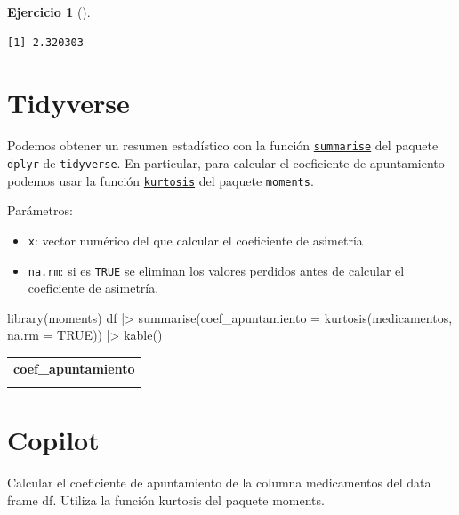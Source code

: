 \documentclass[
  a4paper,
]{scrreport}
\newenvironment{Shaded}{\begin{snugshade}}{\end{snugshade}}
\newcommand{\AttributeTok}[1]{\textcolor[rgb]{0.40,0.45,0.13}{#1}}
\newcommand{\ConstantTok}[1]{\textcolor[rgb]{0.56,0.35,0.01}{#1}}
\newcommand{\ExtensionTok}[1]{\textcolor[rgb]{0.00,0.23,0.31}{#1}}
\newcommand{\FunctionTok}[1]{\textcolor[rgb]{0.28,0.35,0.67}{#1}}
\newcommand{\NormalTok}[1]{\textcolor[rgb]{0.00,0.23,0.31}{#1}}
\newcommand{\SpecialCharTok}[1]{\textcolor[rgb]{0.37,0.37,0.37}{#1}}
\providecommand{\tightlist}{%
  \setlength{\itemsep}{0pt}\setlength{\parskip}{0pt}}\usepackage{longtable,booktabs,array}
\theoremstyle{definition}
\newtheorem{exercise}{Ejercicio}[chapter]
\theoremstyle{remark}
\begin{document}
\begin{exercise}[]
\begin{enumerate}
\begin{tcolorbox}
\begin{verbatim}
[1] 2.320303
\end{verbatim}

  \section{Tidyverse}

  Podemos obtener un resumen estadístico con la función
  \href{https://dplyr.tidyverse.org/reference/summarise.html}{\texttt{summarise}}
  del paquete \texttt{dplyr} de \texttt{tidyverse}. En particular, para
  calcular el coeficiente de apuntamiento podemos usar la función
  \href{https://www.rdocumentation.org/packages/moments/versions/0.14/topics/kurtosis}{\texttt{kurtosis}}
  del paquete \texttt{moments}.

  Parámetros:

  \begin{itemize}
  \tightlist
  \item
    \texttt{x}: vector numérico del que calcular el coeficiente de
    asimetría
  \item
    \texttt{na.rm}: si es \texttt{TRUE} se eliminan los valores perdidos
    antes de calcular el coeficiente de asimetría.
  \end{itemize}

\begin{Shaded}
\begin{Highlighting}[]
\FunctionTok{library}\NormalTok{(moments)}
\NormalTok{df }\SpecialCharTok{|\textgreater{}} \FunctionTok{summarise}\NormalTok{(}\AttributeTok{coef\_apuntamiento =} \FunctionTok{kurtosis}\NormalTok{(medicamentos, }\AttributeTok{na.rm =} \ConstantTok{TRUE}\NormalTok{)) }\SpecialCharTok{|\textgreater{}} 
    \FunctionTok{kable}\NormalTok{()}
\end{Highlighting}
\end{Shaded}

  \begin{longtable}[]{@{}r@{}}
  \toprule\noalign{}
  coef\_apuntamiento \\
  \midrule\noalign{}
  \endhead
  \bottomrule\noalign{}
  \endlastfoot
  2.320303 \\
  \end{longtable}

  \section{Copilot}

\begin{Shaded}
\begin{Highlighting}[]
\ExtensionTok{Calcular}\NormalTok{ el coeficiente de apuntamiento de la columna medicamentos del data frame df. Utiliza la función kurtosis del paquete moments.}


\end{Highlighting}
\end{Shaded}
\end{tcolorbox}
\end{enumerate}
\end{exercise}
\end{document}
